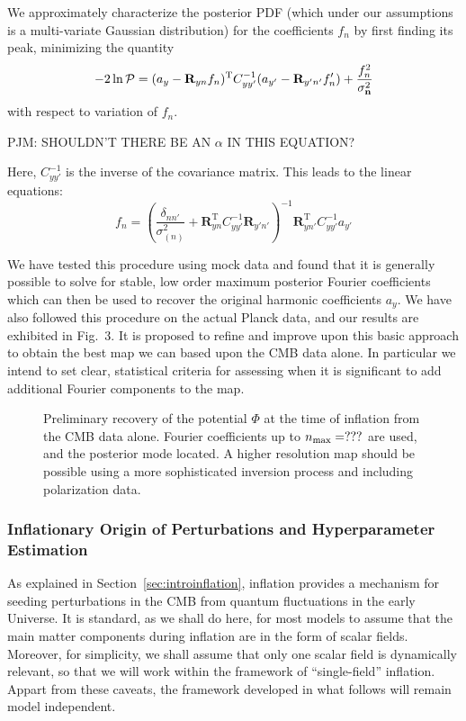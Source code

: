 \documentclass[psfig,11pt]{article}
\begin{document}
We approximately characterize the posterior PDF (which under our assumptions is a multi-variate Gaussian distribution) for the coefficients $f_n$ by first finding its peak, minimizing the quantity
\begin{equation}
-2\ln{\cal P}=(a_y- \mathbf{R}_{yn}f_n)^{\mathrm{T}}C_{yy'}^{-1}(a_{y'}-\mathbf{R}_{y'n'}f_n')+\frac{f_n^2}{\sigma_{\bf n}^2}
\end{equation}
with respect to variation of $f_n$.

PJM: SHOULDN'T THERE BE AN $\alpha$ IN THIS EQUATION?

Here, $C_{yy'}^{-1}$ is the inverse
of the covariance matrix. This leads to the linear equations:
\begin{equation}
f_n=\left(\frac{\delta_{nn'}}{\sigma_{(n)}^2}+\mathbf{R}_{yn}^{\mathrm{T}}C_{yy'}^{-1}\mathbf{R}_{y'n'}\right)^{-1}\mathbf{R}^{\mathrm{T}}_{yn'}C_{yy'}^{-1}a_{y'}
\end{equation}

We have tested this procedure using mock data and found that it is generally possible to solve for stable, low order maximum posterior Fourier coefficients which can then be used to recover the original harmonic coefficients $a_y$. We have also followed this procedure on the actual Planck data, and our results are exhibited in Fig.~3. It is proposed to refine and improve upon this basic approach to obtain the best map we can based upon the CMB data alone. In particular we intend to set clear, statistical criteria for assessing when it is significant to add additional Fourier components to the map.
\begin{figure}[t]
\centering
\caption{Preliminary recovery of the potential $\Phi$ at the time of inflation from the CMB data alone. Fourier coefficients up to $n_{\rm max}=???$ are used, and the posterior mode located. A higher resolution map should be possible using a more sophisticated inversion process and including polarization data.}
\end{figure}

\subsubsection{Inflationary Origin of Perturbations and Hyperparameter Estimation}

\label{sec:researchinflation}

As explained in Section~\ref{sec:introinflation}, inflation provides a mechanism for seeding perturbations in the CMB from quantum fluctuations in the early Universe. It is standard, as we shall do here, for most models to assume that the main matter components during inflation are in the form of scalar fields.%
Moreover, for simplicity, we shall assume that only one scalar field is dynamically relevant, so that we will work within the framework of ``single-field'' inflation. Appart from these caveats, the framework developed in what follows will remain model independent.
\end{document}
